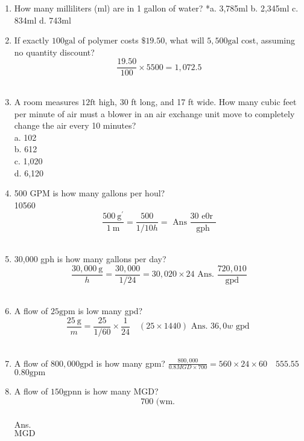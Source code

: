 \documentclass{article}
\begin{document}
\begin{enumerate}
\item How many milliliters (ml) are in 1 gallon of water?
*a. 3,785ml
b. 2,345ml
c. 834ml
d. 743ml


\item If exactly $100 \mathrm{gal}$ of polymer costs $\$ 19.50$, what will $5,500 \mathrm{gal}$ cost, assuming no quantity discount?\\
$$\frac{19.50}{100} \times 5500=1,072.5$$\\

\item A room measures $12 \mathrm{ft}$ high, 30 ft long, and 17 ft wide. How many cubic feet per minute of air must a blower in an air exchange unit move to completely change the air every 10 minutes?\\
a. 102\\
b. 612\\
c. 1,020\\
d. 6,120\\


\item 500 GPM is how many gallons per houl?\\
10560\\
$$\frac{500 \mathrm{~g}^{\prime}}{1 \mathrm{~m}}=\frac{500}{1 / 10 h}=\text { Ans } \frac{30 \text { e0r }}{\mathrm{gph}}$$\\

\item 30,000 gph is how many gallons per day?\\
$$\frac{30,000 \mathrm{~g}}{h}=\frac{30,000}{1 / 24}=30,020 \times 24 \text { Ans. } \frac{720,010}{\mathrm{gpd}}$$\\
\item A flow of $25 \mathrm{gpm}$ is low many gpd?\\
$$\frac{25 \mathrm{~g}}{m}=\frac{25}{1 / 60} \times \frac{1}{24} \quad(25 \times 1440) \text { Ans. } 36,0 w \text { gpd }$$\\

\item A flow of $800,000 \mathrm{gpd}$ is how many gpm? $\frac{800,000}{0.8 M G D \times 700}=560 \times 24 \times 60 \quad 555.55$\\
$0.80 \mathrm{gpm}$\\

\item A flow of $150 \mathrm{gpnn}$ is how many MGD?\\
$$700 \text { (wm. }$$\\
Ans.\\
$\mathrm{MGD}$\\



\end{enumerate}
\end{document}
